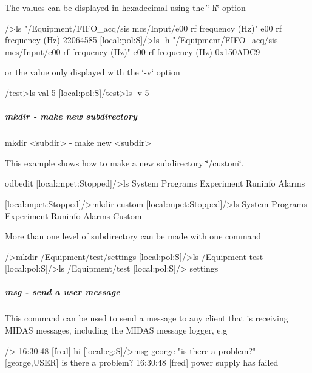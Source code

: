 The values can be displayed in hexadecimal using the \char`\"{}-\/h\char`\"{} option 
\begin{DoxyCode}
/>ls  "/Equipment/FIFO_acq/sis mcs/Input/e00 rf frequency (Hz)"
e00 rf frequency (Hz)           22064585
[local:pol:S]/>ls  -h "/Equipment/FIFO_acq/sis mcs/Input/e00 rf frequency (Hz)"
e00 rf frequency (Hz)           0x150ADC9
\end{DoxyCode}
 \par
or the value only displayed with the \char`\"{}-\/v\char`\"{} option 
\begin{DoxyCode}
/test>ls
val                             5
[local:pol:S]/test>ls -v
5
\end{DoxyCode}




\hypertarget{RC_odbedit_examples_RC_odbedit_mkdir}{}\subparagraph{mkdir -\/ make new subdirectory}\label{RC_odbedit_examples_RC_odbedit_mkdir}

\begin{DoxyCode}
mkdir <subdir>          - make new <subdir>
\end{DoxyCode}
 \par
This example shows how to make a new subdirectory \char`\"{}/custom\char`\"{}. 
\begin{DoxyCode}
 odbedit
[local:mpet:Stopped]/>ls
System
Programs
Experiment
Runinfo
Alarms

[local:mpet:Stopped]/>mkdir custom
[local:mpet:Stopped]/>ls
System
Programs
Experiment
Runinfo
Alarms
Custom
\end{DoxyCode}


More than one level of subdirectory can be made with one command 
\begin{DoxyCode}
/>mkdir /Equipment/test/settings
[local:pol:S]/>ls /Equipment
test
[local:pol:S]/>ls /Equipment/test
[local:pol:S]/>
settings
\end{DoxyCode}




\hypertarget{RC_odbedit_examples_RC_odbedit_msg}{}\subparagraph{msg -\/ send a user message}\label{RC_odbedit_examples_RC_odbedit_msg}
This command can be used to send a message to any client that is receiving MIDAS messages, including the MIDAS message logger, e.g 
\begin{DoxyCode}
[local:cg:S]/>
16:30:48 [fred] hi
[local:cg:S]/>msg george "is there a problem?"
[george,USER] is there a problem?
16:30:48 [fred] power supply has failed
\end{DoxyCode}



